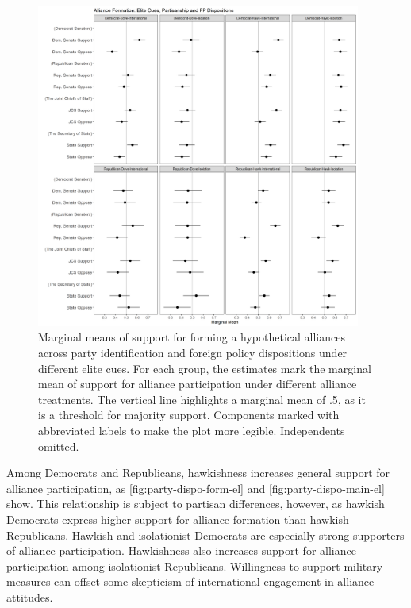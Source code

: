 \documentclass[12pt]{article}
\begin{document}
\begin{figure}[htpb]
	\centering
		\includegraphics[width=0.95\textwidth]{../figures/party-dispo-form-el.png}
	\caption{Marginal means of support for forming a hypothetical alliances across party identification and foreign policy dispositions under different elite cues. For each group, the estimates mark the marginal mean of support for alliance participation under different alliance treatments. The vertical line highlights a marginal mean of .5, as it is a threshold for majority support. Components marked with abbreviated labels to make the plot more legible. Independents omitted.}
	\label{fig:party-dispo-form-el}
\end{figure}


Among Democrats and Republicans, hawkishness increases general support for alliance participation, as \autoref{fig:party-dispo-form-el} and \autoref{fig:party-dispo-main-el} show. 
This relationship is subject to partisan differences, however, as hawkish Democrats express higher support for alliance formation than hawkish Republicans. 
Hawkish and isolationist Democrats are especially strong supporters of alliance participation. 
Hawkishness also increases support for alliance participation among isolationist Republicans. 
Willingness to support military measures can offset some skepticism of international engagement in alliance attitudes. 
\end{document}
